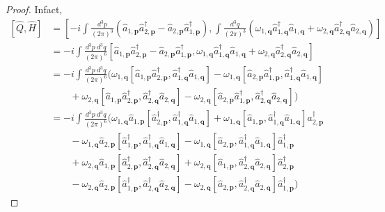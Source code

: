     \begin{proof}
        Infact, 
        \begin{equation*}
        \begin{aligned}
            [\hat Q, \hat H] & = [- i \int \frac{d^3 p}{(2\pi)^3} (\hat a_{1, \mathbf p} \hat a_{2, \mathbf p}^\dagger - \hat a_{2, \mathbf p} \hat a_{1, \mathbf p}^\dagger), \int \frac{d^3 q}{(2\pi)^3} (\omega_{1, \mathbf q} \hat a_{1, \mathbf q}^\dagger \hat a_{1, \mathbf q} + \omega_{2, \mathbf q} \hat a_{2, \mathbf q}^\dagger \hat a_{2, \mathbf q})] \\ & = - i \int \frac{d^3 p ~ d^3 q}{(2\pi)^6} [\hat a_{1, \mathbf p} \hat a_{2, \mathbf p}^\dagger - \hat a_{2, \mathbf p} \hat a_{1, \mathbf p}^\dagger, \omega_{1, \mathbf q} \hat a_{1, \mathbf q}^\dagger \hat a_{1, \mathbf q} + \omega_{2, \mathbf q} \hat a_{2, \mathbf q}^\dagger \hat a_{2, \mathbf q}] \\ & = - i \int \frac{d^3 p ~ d^3 q}{(2\pi)^6} (\omega_{1, \mathbf q} [\hat a_{1, \mathbf p} \hat a_{2, \mathbf p}^\dagger, \hat a_{1, \mathbf q}^\dagger \hat a_{1, \mathbf q}] - \omega_{1, \mathbf q} [\hat a_{2, \mathbf p} \hat a_{1, \mathbf p}^\dagger, \hat a_{1, \mathbf q}^\dagger \hat a_{1, \mathbf q}] \\ & \qquad + \omega_{2, \mathbf q} [\hat a_{1, \mathbf p} \hat a_{2, \mathbf p}^\dagger, \hat a_{2, \mathbf q}^\dagger \hat a_{2, \mathbf q}] - \omega_{2, \mathbf q} [\hat a_{2, \mathbf p} \hat a_{1, \mathbf p}^\dagger, \hat a_{2, \mathbf q}^\dagger \hat a_{2, \mathbf q}]) \\ & = - i \int \frac{d^3 p ~ d^3 q}{(2\pi)^6} (\omega_{1, \mathbf q} \hat a_{1, \mathbf p} [\hat a_{2, \mathbf p}^\dagger, \hat a_{1, \mathbf q}^\dagger \hat a_{1, \mathbf q}] + \omega_{1, \mathbf q} [\hat a_{1, \mathbf p}, \hat a_{1, \mathbf q}^\dagger \hat a_{1, \mathbf q}] \hat a_{2, \mathbf p}^\dagger \\ & \qquad - \omega_{1, \mathbf q} \hat a_{2, \mathbf p} [\hat a_{1, \mathbf p}^\dagger, \hat a_{1, \mathbf q}^\dagger \hat a_{1, \mathbf q}] - \omega_{1, \mathbf q} [\hat a_{2, \mathbf p}, \hat a_{1, \mathbf q}^\dagger \hat a_{1, \mathbf q}]  \hat a_{1, \mathbf p}^\dagger \\ & \qquad + \omega_{2, \mathbf q} \hat a_{1, \mathbf p} [\hat a_{2, \mathbf p}^\dagger, \hat a_{2, \mathbf q}^\dagger \hat a_{2, \mathbf q}] + \omega_{2, \mathbf q}  [\hat a_{1, \mathbf p}, \hat a_{2, \mathbf q}^\dagger \hat a_{2, \mathbf q}] \hat a_{2, \mathbf p}^\dagger \\ & \qquad - \omega_{2, \mathbf q} \hat a_{2, \mathbf p} [\hat a_{1, \mathbf p}^\dagger, \hat a_{2, \mathbf q}^\dagger \hat a_{2, \mathbf q}] - \omega_{2, \mathbf q} [\hat a_{2, \mathbf p}, \hat a_{2, \mathbf q}^\dagger \hat a_{2, \mathbf q}] \hat a_{1, \mathbf p}^\dagger) 

\end{aligned}
\end{equation*}
\end{proof}
